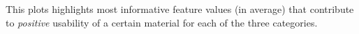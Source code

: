 \documentclass{minimal}
\begin{document}
    
This plots highlights most informative feature values (in average) that contribute to \emph{positive} usability of a certain material for each of the three categories.
\end{document}
